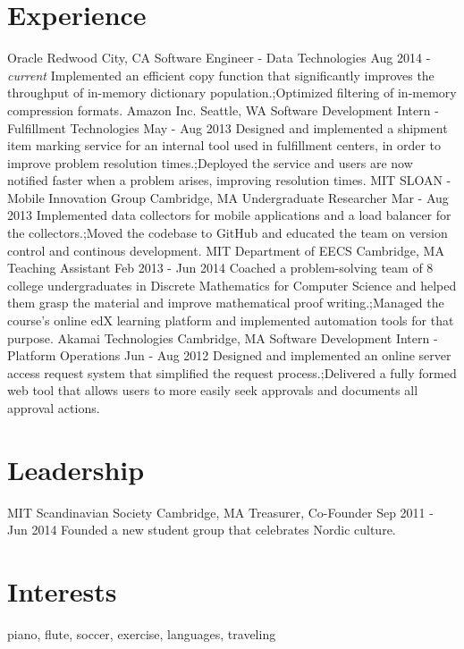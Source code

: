 \documentclass[]{friggeri-cv}
\begin{document}
\section{Experience}

\begin{entrylist}
  \expentry
    {Oracle}
    {Redwood City, CA}
    {Software Engineer - Data Technologies}
    {Aug 2014 - \textit{current}}
    {Implemented an efficient copy function that significantly improves the throughput of in-memory dictionary population.;Optimized filtering of in-memory compression formats.}
  \expentry
    {Amazon Inc.}
    {Seattle, WA}
    {Software Development Intern - Fulfillment Technologies}
    {May - Aug 2013}
    {Designed and implemented a shipment item marking service for an internal tool used in fulfillment centers, in order to improve problem resolution times.;Deployed the service and users are now notified faster when a problem arises, improving resolution times.}
  \expentry
    {MIT SLOAN - Mobile Innovation Group}
    {Cambridge, MA}
    {Undergraduate Researcher}
    {Mar - Aug 2013}
    {Implemented data collectors for mobile applications and a load balancer for the collectors.;Moved the codebase to GitHub and educated the team on version control and continous development.}
  \expentry
    {MIT Department of EECS}
    {Cambridge, MA}
    {Teaching Assistant}
    {Feb 2013 - Jun 2014}
    {Coached a problem-solving team of 8 college undergraduates in Discrete Mathematics for Computer Science and helped them grasp the material and improve mathematical proof writing.;Managed the course’s online edX learning platform and implemented automation tools for that purpose.}
  \expentry
    {Akamai Technologies}
    {Cambridge, MA}
    {Software Development Intern - Platform Operations}
    {Jun - Aug 2012}
    {Designed and implemented an online server access request system that simplified the request process.;Delivered a fully formed web tool that allows users to more easily seek approvals and documents all approval actions.}
\end{entrylist}

\section{Leadership}
\begin{entrylist}
  \expentry
    {MIT Scandinavian Society}
    {Cambridge, MA}
    {Treasurer, Co-Founder}
    {Sep 2011 - Jun 2014}
    {Founded a new student group that celebrates Nordic culture.}
\end{entrylist}

\section{Interests}
    piano, flute, soccer, exercise, languages, traveling
\end{document}
